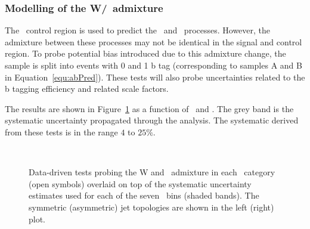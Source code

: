 \subsubsection{Modelling of the W/\ttbar~admixture}

The \mj~control region is used to predict the \wj~and \ttbar~processes. However, the admixture
between these processes may not be identical in the signal and control region.
To probe potential bias introduced due to this admixture change, the sample is split into events with
0 and 1 b tag (corresponding to samples A and B in Equation~\ref{equ:abPred}). These tests will also probe 
uncertainties related to the b tagging efficiency and related scale factors. 

The results are shown in Figure~\ref{fig:closureBTag} as a function of \scalht~and \njet. 
The grey band is the systematic uncertainty propagated through the analysis. 
The systematic derived from these tests is in the range $4$ to $25\%$.

\begin{figure}[h!]
  \begin{center}
    ~~
    \caption{Data-driven tests probing the W and \ttbar~admixture 
      in each \njet~category (open symbols) overlaid on top of the systematic
      uncertainty estimates used for each of the seven \scalht~bins
      (shaded bands). 
      The symmetric (asymmetric) jet topologies are shown in the left (right) plot.      
    }
    \label{fig:closureBTag}
  \end{center} 
\end{figure}

